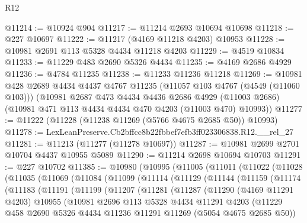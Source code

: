 \begin{lexlean}{R12}
\begin{coremodule}
@11214 := @10924 @904
@11217 := @11214 @2693 @10694 @10698
@11218 := @227 @10697
@11222 := @11217 (@4169 @11218 @4203) @10953
@11228 := @10981 @2691 @113 @5328 @4434 @11218 @4203
@11229 := @4519 @10834
@11233 := @11229 @483 @2690 @5326 @4434
@11235 := @4169 @2686 @4929
@11236 := @4784 @11235
@11238 := @11233 @11236 @11218
@11269 := @10981
    @428
    @2689
    @4434
    @4437
    @4767
    @11235
    (@11057 @103 @4767 (@4549 (@11060 @103)))
    (@10981
      @2687
      @473
      @4434
      @4436
      @2686
      @4929
      (@11003 @2686)
      (@10981 @471 @113 @4434 @4434 @470 @4203 (@11003 @470) @10993))
@11277 := @11222 (@11228 (@11238 @11269 (@5766 @4675 @2685 @50)) @10993)
@11278 := LexLeanPreserve.Cb2bffcc8b22fbbef7efb3ff023306838.R12.__rel_27
@11281 := @11213 (@11277 (@11278 @10697))
@11287 := @10981 @2699 @2701 @10704 @4437 @10955 @5089
@11290 := @11214 @2698 @10694 @10703
@11291 := @227 @10702
@11385 := @10980
    (@10995
      (@11005
        (@11011
          (@11022
            (@11028
              (@11035
                (@11069
                  (@11084
                    (@11099
                      (@11114
                        (@11129
                          (@11144
                            (@11159
                              (@11174
                                (@11183
                                  (@11191
                                    (@11199
                                      (@11207
                                        (@11281
                                          (@11287
                                            (@11290
                                              (@4169 @11291 @4203)
                                              @10955
                                              (@10981
                                                @2696
                                                @113
                                                @5328
                                                @4434
                                                @11291
                                                @4203
                                                (@11229
                                                  @458
                                                  @2690
                                                  @5326
                                                  @4434
                                                  @11236
                                                  @11291
                                                  @11269
                                                  (@5054 @4675 @2685 @50))

\end{coremodule}
\end{lexlean}
